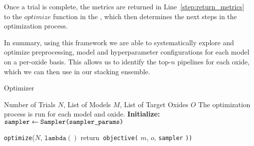 Once a trial is complete, the metrics are returned in Line~\ref{step:return_metrics} to the $optimize$ function in the , which then determines the next steps in the optimization process.

In summary, using this framework we are able to systematically explore and optimize preprocessing, model and hyperparameter configurations for each model on a per-oxide basis.
This allows us to identify the top-$n$ pipelines for each oxide, which we can then use in our stacking ensemble. 

\begin{algorithm}
\caption{Optimizer}
\label{alg:study_function}
\begin{algorithmic}[1]
\Require Number of Trials $N$, List of Models $M$, List of Target Oxides $O$ \label{step:initialize_run_process}
\Ensure The optimization process is run for each model and oxide. 
\State \textbf{Initialize:} $\texttt{sampler} \gets \texttt{Sampler(\texttt{sampler\_params})}$ \label{step:initialize_sampler}

 \label{step:oxide_loop}
     \label{step:model_loop}
        \State \texttt{optimize}($N$, $\texttt{lambda}()$ 
            \State \hspace{1.5em} return\texttt{ objective(}
                \State \hspace{2.5em} $m$, \label{step:model_param_study}
                \State \hspace{2.5em} $o$, \label{step:oxide_param_study}
                \State \hspace{2.5em} \texttt{sampler} \label{step:sampler_param_study}
            \State \texttt{))} \label{step:optimize_combined_objective}
    \EndFor
\EndFor

\end{algorithmic}
\end{algorithm}

